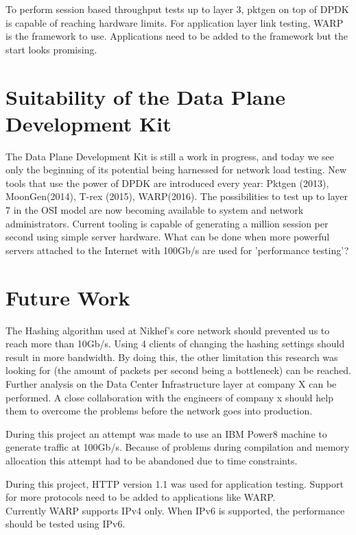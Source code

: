 To perform session based throughput tests up to layer 3, pktgen on top of DPDK is capable of reaching hardware limits.
For application layer link testing, WARP is the framework to use. Applications need to be added to the framework but the start looks promising.

\section{Suitability of the Data Plane Development Kit}
The Data Plane Development Kit is still a work in progress, and today we see only the beginning of its potential being harnessed for network load testing. New tools that use the power of DPDK are introduced every year:
Pktgen (2013), MoonGen(2014), T-rex (2015), WARP(2016).
The possibilities to test up to layer 7 in the OSI model are now becoming available to system and network administrators. 
Current tooling is capable of generating a million session per second using simple server hardware. 
What can be done when more powerful servers attached to the Internet with 100Gb/s are used for 'performance testing'?  

\section{Future Work}
The Hashing algorithm used at Nikhef's core network should prevented us to reach more than 10Gb/s. Using 4 clients of changing the hashing settings should result in more bandwidth. By doing this, the other limitation this research was looking for (the amount of packets per second being a bottleneck) can be reached. Further analysis on the Data Center Infrastructure layer at company X can be performed. A close collaboration with the engineers of company  x should help them to overcome the problems before the network goes into production. 

During this project an attempt was  made to use an IBM Power8 machine to generate traffic at 100Gb/s. Because of problems during compilation and memory allocation this attempt had to be abandoned due to time constraints.

During this project, HTTP version 1.1 was used for application testing. Support for more protocols need to be added to applications like WARP.  \\

Currently WARP supports IPv4 only. When IPv6 is supported, the performance should be tested using IPv6.  \\

